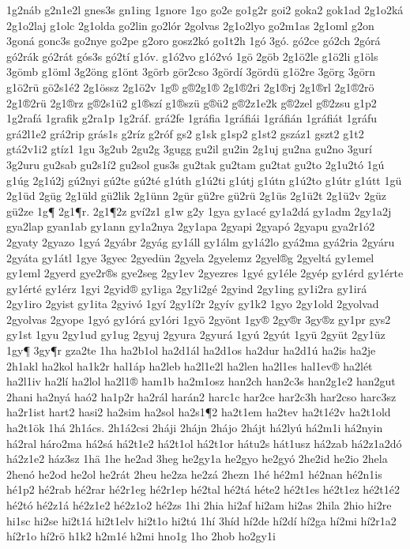{1g2náb
g2n1e2l
gnes3s
gn1ing
1gnore
1go
go2e
go1g2r
goi2
goka2
gok1ad
2g1o2ká
2g1o2laj
g1olc
2g1olda
go2lin
go2lór
2golvas
2g1o2lyo
go2m1as
2g1oml
g2on
3goná
gonc3s
go2nye
go2pe
g2oro
gosz2kó
go1t2h
1gó
3gó.
gó2ce
gó2ch
2górá
gó2rák
gó2rát
gós3s
gó2tí
g1óv.
g1ó2vo
g1ó2vó
1gö
2göb
2g1ö2le
g1ö2li
g1öls
3gömb
g1öml
3g2öng
g1önt
3görb
gör2cso
3gördí
3gördü
g1ö2re
3görg
3görn
g1ö2rü
gö2s1é2
2g1össz
2g1ö2v
1g®
g®2g1®
2g1®2ri
2g1®rj
2g1®rl
2g1®2rö
2g1®2rü
2g1®rz
g®2s1ü2
g1®szí
g1®szü
g®ü2
g®2z1e2k
g®2zel
g®2zsu
g1p2
1g2rafá
1grafik
g2ra1p
1g2ráf.
grá2fe
1gráfia
1gráfiái
1gráfián
1gráfiát
1gráfu
grá2l1e2
grá2rip
grás1s
g2ríz
g2róf
gs2
g1sk
g1sp2
g1st2
gszáz1
gszt2
g1t2
gtá2v1i2
gtíz1
1gu
3g2ub
2gu2g
3gugg
gu2il
gu2in
2g1uj
gu2na
gu2no
3gurí
3g2uru
gu2sab
gu2s1í2
gu2sol
gus3s
gu2tak
gu2tam
gu2tat
gu2to
2g1u2tó
1gú
g1úg
2g1ú2j
gú2nyi
gú2te
gú2té
g1úth
g1ú2ti
g1útj
g1útn
g1ú2to
g1útr
g1útt
1gü
2g1üd
2güg
2g1üld
gü2lik
2g1ünn
2gür
gü2re
gü2rü
2g1üs
2g1ü2t
2g1ü2v
2güz
gü2ze
1g¶
2g1¶r.
2g1¶2z
gví2z1
g1w
g2y
1gya
gy1acé
gy1a2dá
gy1adm
2gy1a2j
gya2lap
gyan1ab
gy1ann
gy1a2nya
2gy1apa
2gyapi
2gyapó
2gyapu
gya2r1ó2
2gyaty
2gyazo
1gyá
2gyábr
2gyág
gy1áll
gy1álm
gy1á2lo
gyá2ma
gyá2ria
2gyáru
2gyáta
gy1átl
1gye
3gyec
2gyedün
2gyela
2gyelemz
2gyel®g
2gyeltá
gy1emel
gy1eml
2gyerd
gye2r®s
gye2seg
2gy1ev
2gyezres
1gyé
gy1éle
2gyép
gy1érd
gy1érte
gy1érté
gy1érz
1gyi
2gyid®
gy1iga
2gy1i2gé
2gyind
2gy1ing
gy1i2ra
gy1irá
2gy1iro
2gyist
gy1ita
2gyivó
1gyí
2gy1í2r
2gyív
gy1k2
1gyo
2gy1old
2gyolvad
2gyolvas
2gyope
1gyó
gy1órá
gy1óri
1gyö
2gyönt
1gy®
2gy®r
3gy®z
gy1pr
gys2
gy1st
1gyu
2gy1ud
gy1ug
2gyuj
2gyura
2gyurá
1gyú
2gyút
1gyü
2gyüt
2gy1üz
1gy¶
3gy¶r
gza2te
1ha
ha2b1ol
ha2d1ál
ha2d1os
ha2dur
ha2d1ú
ha2is
ha2je
2h1akl
ha2kol
ha1k2r
hal1áp
ha2leb
ha2l1e2l
ha2len
ha2l1es
hal1ev®
ha2lét
ha2l1iv
ha2lí
ha2lol
ha2l1®
ham1b
ha2m1osz
han2ch
han2c3s
han2g1e2
han2gut
2hani
ha2nyá
haó2
ha1p2r
ha2rál
harán2
harc1c
har2ce
har2c3h
har2cso
harc3sz
ha2r1ist
hart2
hasi2
ha2sim
ha2sol
ha2s1¶2
ha2t1em
ha2tev
ha2t1é2v
ha2t1old
ha2t1ök
1há
2h1ács.
2h1á2csi
2háji
2hájn
2hájo
2hájt
há2lyú
há2m1i
há2nyin
há2ral
háro2ma
há2sá
há2t1e2
há2t1ol
há2t1or
hátu2s
hát1usz
há2zab
há2z1a2dó
há2z1e2
ház3sz
1hä
1he
he2ad
3heg
he2gy1a
he2gyo
he2gyó
2he2id
he2io
2hela
2henó
he2od
he2ol
he2rát
2heu
he2za
he2zá
2hezn
1hé
hé2m1
hé2nan
hé2n1is
hé1p2
hé2rab
hé2rar
hé2r1eg
hé2r1ep
hé2tal
hé2tá
héte2
hé2t1es
hé2t1ez
hé2t1é2
hé2tó
hé2z1á
hé2z1e2
hé2z1o2
hé2zs
1hi
2hia
hi2af
hi2am
hi2as
2hila
2hio
hi2re
hi1sc
hi2se
hi2t1á
hi2t1elv
hi2t1o
hi2tú
1hí
3híd
hí2de
hí2dí
hí2ga
hí2mi
hí2r1a2
hí2r1o
hí2rö
h1k2
h2m1é
h2mi
hno1g
1ho
2hob
ho2gy1i
}
